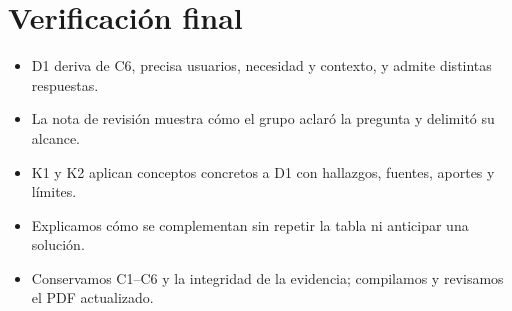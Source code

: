 \documentclass[12pt,a4paper]{article}
\newcommand{\checkbox}{\fbox{\rule{0pt}{0.8ex}\rule{0.8ex}{0pt}}}
\begin{document}
\section*{Verificación final}
{\small\begin{itemize}[label=\checkbox]
\item D1 deriva de C6, precisa usuarios, necesidad y contexto, y admite distintas respuestas.
\item La nota de revisión muestra cómo el grupo aclaró la pregunta y delimitó su alcance.
\item K1 y K2 aplican conceptos concretos a D1 con hallazgos, fuentes, aportes y límites.
\item Explicamos cómo se complementan sin repetir la tabla ni anticipar una solución.
\item Conservamos C1--C6 y la integridad de la evidencia; compilamos y revisamos el PDF actualizado.
\end{itemize}}
\end{document}
